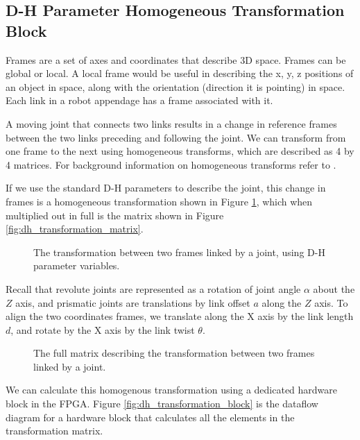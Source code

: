 \subsection{D-H Parameter Homogeneous Transformation Block}

Frames are a set of axes and coordinates that describe 3D space. Frames can be global or local. A local frame would be useful in describing the x, y, z positions of an object in space, along with the orientation (direction it is pointing) in space. Each link in a robot appendage has a frame associated with it.

A moving joint that connects two links results in a change in reference frames between the two links preceding and following the joint. We can transform from one frame to the next using homogeneous transforms, which are described as 4 by 4 matrices. For background information on homogeneous transforms refer to \cite{frames}.

If we use the standard D-H parameters to describe the joint, this change in frames is a homogeneous transformation shown in Figure \ref{fig:dh_transform_equation}, which when multiplied out in full is the matrix shown in Figure \ref{fig:dh_transformation_matrix}. 

\begin{figure}[ht]
\center
{}
\caption{The transformation between two frames linked by a joint, using D-H parameter variables.}
\label{fig:dh_transform_equation}
\end{figure}

Recall that revolute joints are represented as a rotation of joint angle $\alpha$ about the $Z$ axis, and prismatic joints are translations by link offset $a$ along the $Z$ axis. To align the two coordinates frames, we translate along the X axis by the link length $d$, and rotate by the X axis by the link twist $\theta$.

\begin{figure}[ht]
\center
{}
\caption{The full matrix describing the transformation between two frames linked by a joint.}
\label{fig:dh_transform_matrix}
\end{figure}

We can calculate this homogenous transformation using a dedicated hardware block in the FPGA. Figure \ref{fig:dh_transformation_block} is the dataflow diagram for a hardware block that calculates all the elements in the transformation matrix.

